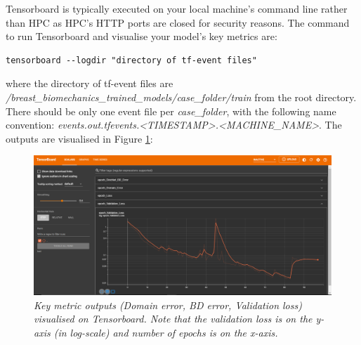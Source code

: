\documentclass[11pt]{article}
\makeatletter
\newcommand{\boxspacing}{\kern\kvtcb@left@rule\kern\kvtcb@boxsep}
\newcommand{\prompt}[4]{
        {\ttfamily\llap{{\color{#2}[#3]:\hspace{3pt}#4}}\vspace{-\baselineskip}}
    }
\makeatother
\begin{document}
Tensorboard is typically executed on your local machine's command line rather than HPC as HPC's HTTP ports are closed for security reasons. The command to run Tensorboard and visualise your model's key metrics are: 
\begin{tcolorbox}[breakable, size=fbox, boxrule=1pt, pad at break*=1mm,colback=cellbackground, colframe=cellborder]
\prompt{In}{incolor}{7}{\boxspacing}
\begin{Verbatim}[commandchars=\\\{\}]
tensorboard --logdir "directory of tf-event files"
\end{Verbatim}
\end{tcolorbox} 
where the directory of tf-event files are  \textit{/breast\_biomechanics\_trained\_models/case\_folder/train} from the root directory. There should be only one event file per \textit{case\_folder}, with the following name convention: \textit{events.out.tfevents.<TIMESTAMP>.<MACHINE\_NAME>}. The outputs are visualised in Figure \ref{fig7}: 

\begin{figure}
\centering
\includegraphics[scale=1.1]{Images/breast/surrogate_model/tensorboard.png}
\caption{\textit{\label{fig7}Key metric outputs (Domain error, BD error, Validation loss) visualised on Tensorboard. Note that the validation loss is on the y-axis (in log-scale) and number of epochs is on the x-axis.}}
\end{figure}
\end{document}
